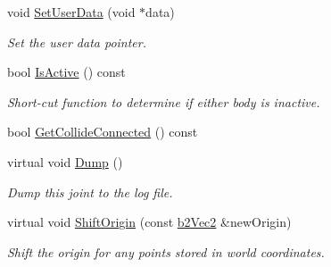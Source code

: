 \begin{DoxyCompactItemize}
\mbox{\label{classb2Joint_a492f2d02496437572aaec6013ebdc1c8}} 
void \mbox{\hyperlink{classb2Joint_a492f2d02496437572aaec6013ebdc1c8}{Set\+User\+Data}} (void $\ast$data)
\begin{DoxyCompactList}\small\item\em Set the user data pointer. \end{DoxyCompactList}\item 
\mbox{\label{classb2Joint_ae9cfbd158216c9855c2f018ff3c9c922}} 
bool \mbox{\hyperlink{classb2Joint_ae9cfbd158216c9855c2f018ff3c9c922}{Is\+Active}} () const
\begin{DoxyCompactList}\small\item\em Short-\/cut function to determine if either body is inactive. \end{DoxyCompactList}\item 
bool \mbox{\hyperlink{classb2Joint_a48492903df96c8a7b8cad8ed826f8cb0}{Get\+Collide\+Connected}} () const
\item 
\mbox{\label{classb2Joint_abd35e7316017ad9a40d5dbf9b5ba3f36}} 
virtual void \mbox{\hyperlink{classb2Joint_abd35e7316017ad9a40d5dbf9b5ba3f36}{Dump}} ()
\begin{DoxyCompactList}\small\item\em Dump this joint to the log file. \end{DoxyCompactList}\item 
\mbox{\label{classb2Joint_a7804f649e993dc0fd9ae47fde5601f90}} 
virtual void \mbox{\hyperlink{classb2Joint_a7804f649e993dc0fd9ae47fde5601f90}{Shift\+Origin}} (const \mbox{\hyperlink{structb2Vec2}{b2\+Vec2}} \&new\+Origin)
\begin{DoxyCompactList}\small\item\em Shift the origin for any points stored in world coordinates. \end{DoxyCompactList}\end{DoxyCompactItemize}
